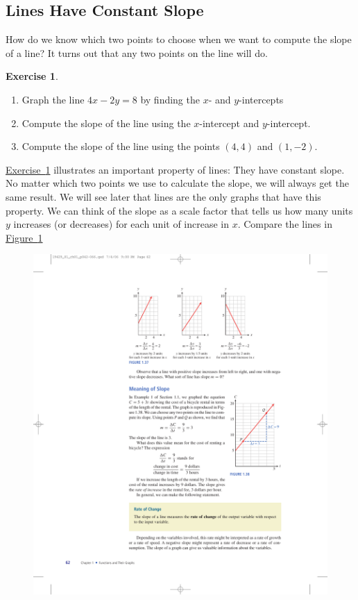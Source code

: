 \documentclass[10pt,]{book}
\theoremstyle{plain}
\theoremstyle{definition}
\theoremstyle{definition}
\theoremstyle{definition}
\theoremstyle{definition}
\newtheorem{exercise}[theorem]{Exercise}
\numberwithin{equation}{part}
\begin{document}
\subsection[{Lines Have Constant Slope}]{Lines Have Constant Slope}\label{subsection-24}
How do we know which two points to choose when we want to compute the slope of a line? It turns out that any two points on the line will do.%
\begin{exercise}\label{exercise-slope-any-points}
\leavevmode%
\begin{enumerate}[label=*\alph**]
\item\hypertarget{li-881}{}Graph the line \(4x - 2y = 8\) by finding the \(x\)- and \(y\)-intercepts%
\item\hypertarget{li-882}{}Compute the slope of the line using the \(x\)-intercept and \(y\)-intercept.%
\item\hypertarget{li-883}{}Compute the slope of the line using the points \((4, 4)\) and \((1, -2)\).%
\end{enumerate}
\end{exercise}
\hyperref[exercise-slope-any-points]{Exercise~\ref{exercise-slope-any-points}} illustrates an important property of lines: They have constant slope. No matter which two points we use to calculate the slope, we will always get the same result. We will see later that lines are the only graphs that have this property. We can think of the slope as a scale factor that tells us how many units \(y\) increases (or decreases) for each unit of increase in \(x\). Compare the lines in \hyperref[fig-slope-scale-factor]{Figure~\ref{fig-slope-scale-factor}} \begin{figure}
\centering
\includegraphics[width=1\linewidth]{images/fig-slope-scale-factor}
\caption{\label{fig-slope-scale-factor}}
\end{figure}
\end{document}
